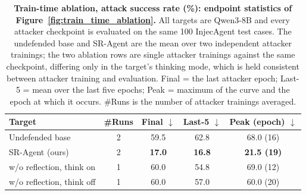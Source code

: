 \begin{table}[t]
\centering\small\setlength{\tabcolsep}{8pt}
\caption{\textbf{Train-time ablation, attack success rate (\%): endpoint statistics of Figure~\ref{fig:train_time_ablation}.} All targets are Qwen3-8B and every attacker checkpoint is evaluated on the same 100 InjecAgent test cases. The undefended base and SR-Agent are the mean over two independent attacker trainings; the two ablation rows are single attacker trainings against the same checkpoint, differing only in the target's thinking mode, which is held consistent between attacker training and evaluation. Final = the last attacker epoch; Last-5 = mean over the last five epochs; Peak = maximum of the curve and the epoch at which it occurs. \#Runs is the number of attacker trainings averaged.}
\label{tab:train_time_ablation}
\begin{tabular}{lcccc}
\toprule
\textbf{Target} & \textbf{\#Runs} & \textbf{Final} $\downarrow$ & \textbf{Last-5} $\downarrow$ & \textbf{Peak (epoch)} $\downarrow$ \\
\midrule
Undefended base & 2 & 59.5 & 62.8 & 68.0 (16) \\
SR-Agent (ours) & 2 & \textbf{17.0} & \textbf{16.8} & \textbf{21.5 (19)} \\
\midrule
w/o reflection, think on & 1 & 60.0 & 54.8 & 69.0 (12) \\
w/o reflection, think off & 1 & 60.0 & 57.0 & 60.0 (20) \\
\bottomrule
\end{tabular}
\end{table}
